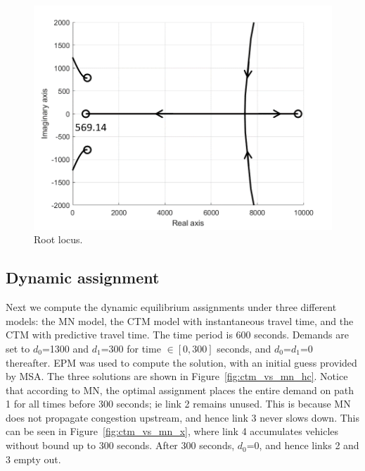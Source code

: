 \begin{figure}[h]
    \centering
    \includegraphics[width=0.8\linewidth]{figs/rlocus_mod.png}
    \caption{Root locus.}
    \label{fig:rlocus}
\end{figure}

\subsection{Dynamic assignment}


Next we compute the dynamic equilibrium assignments under three different models: the MN model, the CTM model with instantaneous travel time, and the CTM with predictive travel time. The time period is 600 seconds. Demands are set to $d_0$=1300 and $d_1$=300 for time $\in[0,300]$ seconds, and $d_0$=$d_1$=0 thereafter. EPM was used to compute the solution, with an initial guess provided by MSA. The three solutions are shown in Figure~\ref{fig:ctm_vs_mn_hc}. Notice that according to MN, the optimal assignment places the entire demand on path 1 for all times before 300 seconds; ie link 2 remains unused. This is because MN does not propagate congestion upstream, and hence link 3 never slows down. This can be seen in Figure~\ref{fig:ctm_vs_mn_x}, where link 4 accumulates vehicles without bound up to 300 seconds. After 300 seconds, $d_0$=0, and hence links 2 and 3 empty out. 


